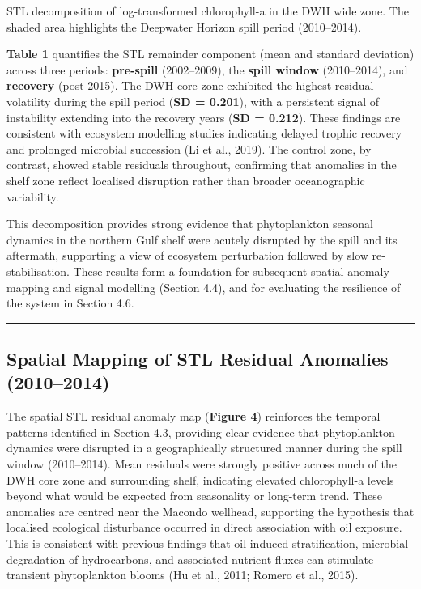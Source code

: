 \documentclass[
  11pt,
]{article}
\begin{document}
STL decomposition of log-transformed chlorophyll-a in the DWH wide zone.
The shaded area highlights the Deepwater Horizon spill period
(2010--2014).

\textbf{Table 1} quantifies the STL remainder component (mean and
standard deviation) across three periods: \textbf{pre-spill}
(2002--2009), the \textbf{spill window} (2010--2014), and
\textbf{recovery} (post-2015). The DWH core zone exhibited the highest
residual volatility during the spill period (\textbf{SD = 0.201}), with
a persistent signal of instability extending into the recovery years
(\textbf{SD = 0.212}). These findings are consistent with ecosystem
modelling studies indicating delayed trophic recovery and prolonged
microbial succession (Li et al., 2019). The control zone, by contrast,
showed stable residuals throughout, confirming that anomalies in the
shelf zone reflect localised disruption rather than broader
oceanographic variability.

This decomposition provides strong evidence that phytoplankton seasonal
dynamics in the northern Gulf shelf were acutely disrupted by the spill
and its aftermath, supporting a view of ecosystem perturbation followed
by slow re-stabilisation. These results form a foundation for subsequent
spatial anomaly mapping and signal modelling (Section 4.4), and for
evaluating the resilience of the system in Section 4.6.

\begin{center}\rule{0.5\linewidth}{0.5pt}\end{center}

\subsection{Spatial Mapping of STL Residual Anomalies
(2010--2014)}\label{spatial-mapping-of-stl-residual-anomalies-20102014}

The spatial STL residual anomaly map (\textbf{Figure 4}) reinforces the
temporal patterns identified in Section 4.3, providing clear evidence
that phytoplankton dynamics were disrupted in a geographically
structured manner during the spill window (2010--2014). Mean residuals
were strongly positive across much of the DWH core zone and surrounding
shelf, indicating elevated chlorophyll-a levels beyond what would be
expected from seasonality or long-term trend. These anomalies are
centred near the Macondo wellhead, supporting the hypothesis that
localised ecological disturbance occurred in direct association with oil
exposure. This is consistent with previous findings that oil-induced
stratification, microbial degradation of hydrocarbons, and associated
nutrient fluxes can stimulate transient phytoplankton blooms (Hu et al.,
2011; Romero et al., 2015).
\end{document}
